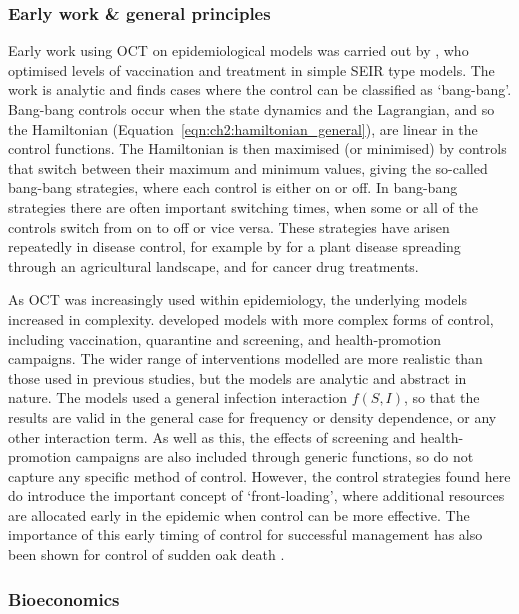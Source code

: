 \subsubsection{Early work \& general principles}

Early work using OCT on epidemiological models was carried out by \citet{sethi_optimal_1978}, who optimised levels of vaccination and treatment in simple SEIR type models. The work is analytic and finds cases where the control can be classified as `bang-bang'. Bang-bang controls occur when the state dynamics and the Lagrangian, and so the Hamiltonian (Equation~\ref{eqn:ch2:hamiltonian_general}), are linear in the control functions. The Hamiltonian is then maximised (or minimised) by controls that switch between their maximum and minimum values, giving the so-called bang-bang strategies, where each control is either on or off. In bang-bang strategies there are often important switching times, when some or all of the controls switch from on to off or vice versa. These strategies have arisen repeatedly in disease control, for example by \citet{forster_optimizing_2007} for a plant disease spreading through an agricultural landscape, and \citet{panetta_optimal_2003} for cancer drug treatments.

As OCT was increasingly used within epidemiology, the underlying models increased in complexity. \citet{behncke_optimal_2000} developed models with more complex forms of control, including vaccination, quarantine and screening, and health-promotion campaigns. The wider range of interventions modelled are more realistic than those used in previous studies, but the models are analytic and abstract in nature. The models used a general infection interaction $f(S, I)$, so that the results are valid in the general case for frequency or density dependence, or any other interaction term. As well as this, the effects of screening and health-promotion campaigns are also included through generic functions, so do not capture any specific method of control. However, the control strategies found here do introduce the important concept of `front-loading', where additional resources are allocated early in the epidemic when control can be more effective. The importance of this early timing of control for successful management has also been shown for control of sudden oak death \citep{cunniffe_modelling_2016}.

\subsubsection{Bioeconomics}

